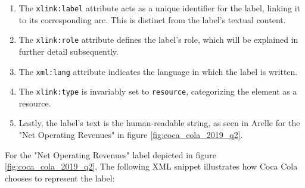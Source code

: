 


\begin{enumerate}
    \item The \texttt{xlink:label} attribute acts as a unique identifier for the label, linking it to its corresponding arc.  
    This is distinct from the label's textual content.  
    \item The \texttt{xlink:role} attribute defines the label's role, which will be explained in further detail subsequently.  
    \item The \texttt{xml:lang} attribute indicates the language in which the label is written.  
    \item The \texttt{xlink:type} is invariably set to \texttt{resource}, categorizing the element as a resource.  
    \item Lastly, the label's text is the human-readable string, as seen in Arelle for the "Net Operating Revenues" in figure \ref{fig:coca_cola_2019_q2}.  
\end{enumerate}

For the "Net Operating Revenues" label depicted in figure \ref{fig:coca_cola_2019_q2}, 
The following XML snippet illustrates how Coca Cola\cite{ko2019q2} chooses to represent the label:

